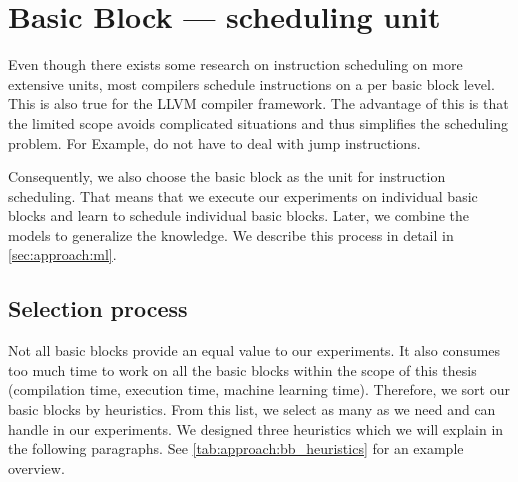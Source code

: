 \section{Basic Block --- scheduling unit}
\label{sec:approach:basicblock}
Even though there exists some research on instruction scheduling on more extensive units, most compilers schedule instructions on a per basic block level.
This is also true for the LLVM compiler framework.
The advantage of this is that the limited scope avoids complicated situations and thus simplifies the scheduling problem.
For Example, do not have to deal with jump instructions.

Consequently, we also choose the basic block as the unit for instruction scheduling.
That means that we execute our experiments on individual basic blocks and learn to schedule individual basic blocks.
Later, we combine the models to generalize the knowledge.
We describe this process in detail in \cref{sec:approach:ml}.

\subsection{Selection process}
\label{sec:approach:basicblock:selection}
Not all basic blocks provide an equal value to our experiments.
It also consumes too much time to work on all the basic blocks within the scope of this thesis (\eg compilation time, execution time, machine learning time).
Therefore, we sort our basic blocks by heuristics. 
From this list, we select as many as we need and can handle in our experiments.
We designed three heuristics which we will explain in the following paragraphs.
See \cref{tab:approach:bb_heuristics} for an example overview.

